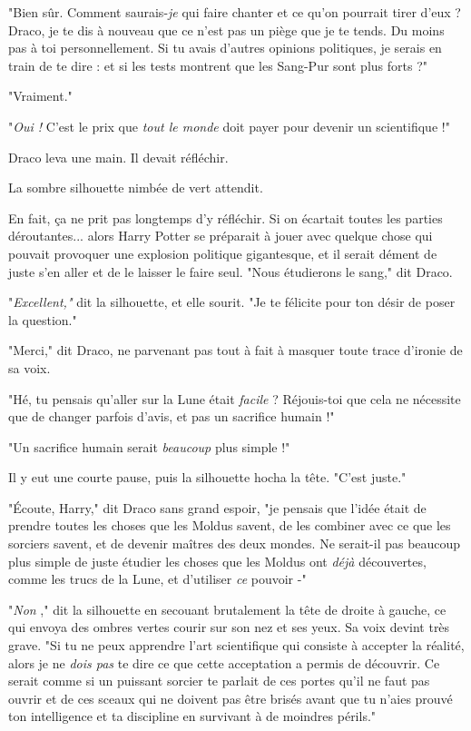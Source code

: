 "Bien sûr. Comment saurais-\emph{je}  qui faire chanter et ce qu'on pourrait tirer d'eux ? Draco, je te dis à nouveau que ce n'est pas un piège que je te tends. Du moins pas à toi personnellement. Si tu avais d'autres opinions politiques, je serais en train de te dire : et si les tests montrent que les Sang-Pur sont plus forts ?"

"Vraiment."

"\emph{Oui !}  C'est le prix que \emph{tout le monde}  doit payer pour devenir un scientifique !"

Draco leva une main. Il devait réfléchir.

La sombre silhouette nimbée de vert attendit.

En fait, ça ne prit pas longtemps d'y réfléchir. Si on écartait toutes les parties déroutantes... alors Harry Potter se préparait à jouer avec quelque chose qui pouvait provoquer une explosion politique gigantesque, et il serait dément de juste s'en aller et de le laisser le faire seul. "Nous étudierons le sang," dit Draco.

"\emph{Excellent,"}  dit la silhouette, et elle sourit. "Je te félicite pour ton désir de poser la question."

"Merci," dit Draco, ne parvenant pas tout à fait à masquer toute trace d'ironie de sa voix.

"Hé, tu pensais qu'aller sur la Lune était \emph{facile}  ? Réjouis-toi que cela ne nécessite que de changer parfois d'avis, et pas un sacrifice humain !"

"Un sacrifice humain serait \emph{beaucoup}  plus simple !"

Il y eut une courte pause, puis la silhouette hocha la tête. "C'est juste."

"Écoute, Harry," dit Draco sans grand espoir, "je pensais que l'idée était de prendre toutes les choses que les Moldus savent, de les combiner avec ce que les sorciers savent, et de devenir maîtres des deux mondes. Ne serait-il pas beaucoup plus simple de juste étudier les choses que les Moldus ont \emph{déjà}  découvertes, comme les trucs de la Lune, et d'utiliser \emph{ce}  pouvoir -"

"\emph{Non} ," dit la silhouette en secouant brutalement la tête de droite à gauche, ce qui envoya des ombres vertes courir sur son nez et ses yeux. Sa voix devint très grave. "Si tu ne peux apprendre l'art scientifique qui consiste à accepter la réalité, alors je ne \emph{dois pas}  te dire ce que cette acceptation a permis de découvrir. Ce serait comme si un puissant sorcier te parlait de ces portes qu'il ne faut pas ouvrir et de ces sceaux qui ne doivent pas être brisés avant que tu n'aies prouvé ton intelligence et ta discipline en survivant à de moindres périls."

